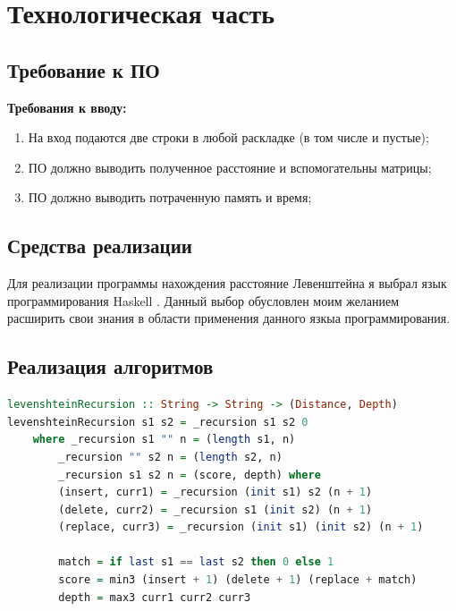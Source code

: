 \documentclass[12pt]{report}
\begin{document}
\chapter{Технологическая часть}

\section{Требование к ПО}
\textbf{Требования к вводу:}
\begin{enumerate}
	\item На вход подаются две строки в любой раскладке (в том числе и пустые);
	\item ПО должно выводить полученное расстояние и вспомогательны матрицы;
	\item ПО должно выводить потраченную память и время;
\end{enumerate}

\section{Средства реализации}
Для реализации программы нахождения расстояние Левенштейна я выбрал язык программирования Haskell \cite{Haskell}. Данный
выбор обусловлен моим желанием расширить свои знания в области
применения данного язкыа программирования.

\section{Реализация алгоритмов}

\begin{lstlisting}[label=some-code,caption=Функция нахождения расстояния Левенштейна рекурсивно,language=Haskell]
levenshteinRecursion :: String -> String -> (Distance, Depth)
levenshteinRecursion s1 s2 = _recursion s1 s2 0
	where _recursion s1 "" n = (length s1, n)
		_recursion "" s2 n = (length s2, n)
		_recursion s1 s2 n = (score, depth) where
		(insert, curr1) = _recursion (init s1) s2 (n + 1)
		(delete, curr2) = _recursion s1 (init s2) (n + 1)
		(replace, curr3) = _recursion (init s1) (init s2) (n + 1)

		match = if last s1 == last s2 then 0 else 1
		score = min3 (insert + 1) (delete + 1) (replace + match)
		depth = max3 curr1 curr2 curr3
\end{lstlisting}
\end{document}
